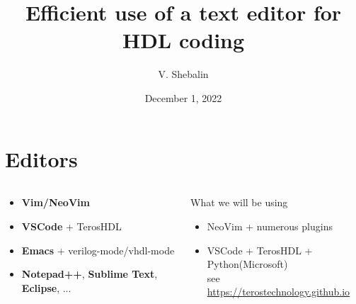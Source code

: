 \documentclass[aspectratio=169]{beamer}
\title[]{\bf Efficient use of a text editor for HDL coding}
\author{V. Shebalin}
\institute{\inst{}
{\textit {}}
}
\date[]{December 1,  2022}
\begin{document}
\frame{\titlepage
}

\footnotesize

\section*{Editors}
\begin{frame}{\secname}

  \begin{columns}
    \begin{column}{0.5\textwidth}
  \begin{itemize}
    \item {\bf Vim/NeoVim}
    \item {\bf VSCode} + TerosHDL
    \item {\bf Emacs} + verilog-mode/vhdl-mode
    \item {\bf Notepad++}, {\bf Sublime Text}, {\bf Eclipse}, ...
  \end{itemize}
      
    \end{column}
    \begin{column}{0.5\textwidth}
  \begin{block}{What we will be using}
    \begin{itemize}
      \item NeoVim + numerous plugins
      \item VSCode + TerosHDL + Python(Microsoft) \\
        see \url{https://terostechnology.github.io}
    \end{itemize}
    
  \end{block}
      
    \end{column}
  \end{columns}

\end{frame}

\end{document}
